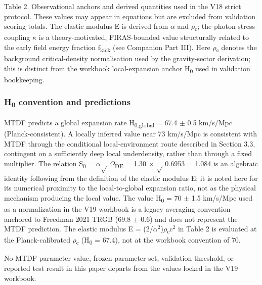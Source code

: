 \documentclass[11pt,a4paper]{article}
\begin{document}
Table 2. Observational anchors and derived quantities used in the V18 strict protocol. These values may appear in equations but are excluded from validation scoring totals. The elastic modulus E is derived from $\alpha$ and $\rho$\textsubscript{c}; the photon-stress coupling $\kappa$ is a theory-motivated, FIRAS-bounded value structurally related to the early field energy fraction f\textsubscript{kick} (see Companion Part III). Here $\rho$\textsubscript{c} denotes the background critical-density normalisation used by the gravity-sector derivation; this is distinct from the workbook local-expansion anchor H\textsubscript{0} used in validation bookkeeping.\begin{mdframed}[linecolor=accent,linewidth=0.5pt,backgroundcolor=callout-bg,leftline=true,rightline=true,topline=true,bottomline=true,innerleftmargin=8pt,innerrightmargin=8pt,innertopmargin=6pt,innerbottommargin=6pt]
\subsubsection{H\textsubscript{0} convention and predictions}
MTDF predicts a global expansion rate H\textsubscript{0,global} = 67.4 $\pm$ 0.5 km/\allowbreak{}s/\allowbreak{}Mpc (Planck-consistent). A locally inferred value near 73 km/\allowbreak{}s/\allowbreak{}Mpc is consistent with MTDF through the conditional local-environment route described in Section 3.3, contingent on a sufficiently deep local underdensity, rather than through a fixed multiplier. The relation S\textsubscript{0} = $\alpha$$\sqrt{\,}$$\Omega$\textsubscript{DE} = 1.30 $\times$ $\sqrt{\,}$0.6953 = 1.084 is an algebraic identity following from the definition of the elastic modulus E; it is noted here for its numerical proximity to the local-to-global expansion ratio, not as the physical mechanism producing the local value. The value H\textsubscript{0} = 70 $\pm$ 1.5 km/\allowbreak{}s/\allowbreak{}Mpc used as a normalization in the V19 workbook is a legacy averaging convention anchored to Freedman 2021 TRGB (69.8 $\pm$ 0.6) and does not represent the MTDF prediction. The elastic modulus E = (2/\allowbreak{}$\alpha$$^{2}$)$\rho$\textsubscript{c}c$^{2}$ in Table 2 is evaluated at the Planck-calibrated $\rho$\textsubscript{c} (H\textsubscript{0} = 67.4), not at the workbook convention of 70.
\end{mdframed}

No MTDF parameter value, frozen parameter set, validation threshold, or reported test result in this paper departs from the values locked in the V19 workbook.
\end{document}
